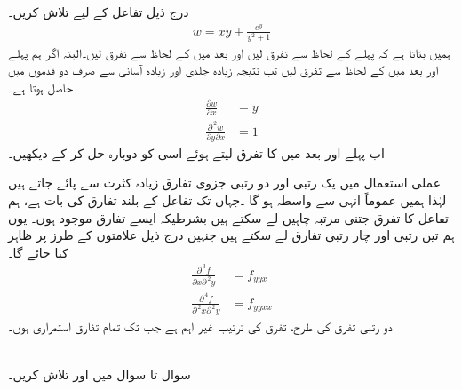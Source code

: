 درج ذیل تفاعل کے لیے  تلاش کریں۔
\begin{align*}
w=xy+\frac{e^y}{y^2+1}
\end{align*}
ہمیں    بتاتا ہے  کہ پہلے  کے لحاظ سے تفرق لیں اور بعد میں  کے لحاظ سے تفرق لیں۔البتہ اگر ہم پہلے  اور بعد میں  کے لحاظ  سے تفرق لیں تب  نتیجہ زیادہ جلدی   اور زیادہ  آسانی سے صرف دو  قدموں  میں   حاصل ہوتا ہے۔ 
\begin{align*}
\frac{\partial w}{\partial x}&=y\\
\frac{\partial^{\,2}w}{\partial y\partial x}&=1
\end{align*}
اب  پہلے  اور بعد میں  کا تفرق لیتے ہوئے اسی کو دوبارہ حل کر کے دیکھیں۔

عملی استعمال میں یک رتبی اور دو رتبی جزوی تفارق   زیادہ کثرت سے پائے جاتے ہیں لہٰذا ہمیں عموماً انہی سے واسطہ ہو گا ۔جہاں تک تفاعل کے بلند تفارق  کی بات ہے، ہم   تفاعل کا تفرق  جتنی   مرتبہ  چاہیں لے سکتے ہیں بشرطیکہ ایسے تفارق موجود ہوں۔ یوں ہم تین رتبی اور چار رتبی تفارق لے سکتے ہیں جنہیں درج ذیل علامتوں  کے طرز    پر  ظاہر کیا جائے گا۔
 \begin{align*}
\frac{\partial^{\,3}f}{\partial x\partial^{\,2}y}&=f_{yyx}\\
\frac{\partial^{\,4}f}{\partial^{\,2}x\partial^{\,2}y}&=f_{yyxx}
\end{align*}
دو رتبی تفرق کی طرح،   تفرق کی ترتیب غیر اہم ہے جب تک تمام  تفارق استمراری ہوں۔


\\
سوال   تا سوال   میں  اور  تلاش کریں۔

